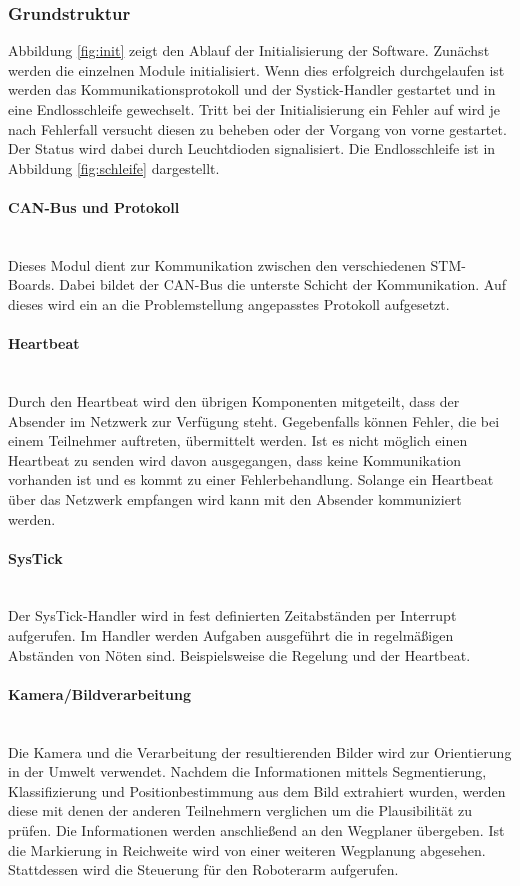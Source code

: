 \subsubsection{Grundstruktur}
Abbildung \ref{fig:init} zeigt den Ablauf der Initialisierung der Software. Zunächst werden die einzelnen Module initialisiert. Wenn dies erfolgreich durchgelaufen ist werden das Kommunikationsprotokoll und der Systick-Handler gestartet und in eine Endlosschleife gewechselt. Tritt bei der Initialisierung ein Fehler auf wird je nach Fehlerfall versucht diesen zu beheben oder der Vorgang von vorne gestartet. Der Status wird dabei durch Leuchtdioden signalisiert.
Die Endlosschleife ist in Abbildung \ref{fig:schleife} dargestellt.

\paragraph{CAN-Bus und  Protokoll}$\;$\\
Dieses Modul dient zur Kommunikation zwischen den verschiedenen STM-Boards. Dabei bildet der CAN-Bus die unterste Schicht der Kommunikation. Auf dieses wird ein an die Problemstellung angepasstes Protokoll aufgesetzt. %

\paragraph{Heartbeat}$\;$\\
Durch den Heartbeat wird den übrigen Komponenten mitgeteilt, dass der Absender im Netzwerk zur Verfügung steht. Gegebenfalls können Fehler, die bei einem Teilnehmer auftreten, übermittelt werden. Ist es nicht möglich einen Heartbeat zu senden wird davon ausgegangen, dass keine Kommunikation vorhanden ist und es kommt zu einer  Fehlerbehandlung. Solange ein Heartbeat über das Netzwerk empfangen wird kann mit den Absender kommuniziert werden.

\paragraph{SysTick}$\;$\\
Der SysTick-Handler wird in fest definierten Zeitabständen per Interrupt aufgerufen. Im Handler werden Aufgaben ausgeführt die in regelmäßigen Abständen von Nöten sind. Beispielsweise die Regelung und der Heartbeat.

\paragraph{Kamera/Bildverarbeitung}$\;$\\
Die Kamera und die Verarbeitung der resultierenden Bilder wird zur Orientierung in der Umwelt verwendet. Nachdem die Informationen mittels Segmentierung, Klassifizierung und Positionbestimmung aus dem Bild extrahiert wurden, werden diese mit denen der anderen Teilnehmern verglichen um die Plausibilität zu prüfen. Die Informationen werden anschließend an den Wegplaner übergeben. Ist die Markierung in Reichweite wird von einer weiteren Wegplanung abgesehen. Stattdessen wird die Steuerung für den Roboterarm aufgerufen.

